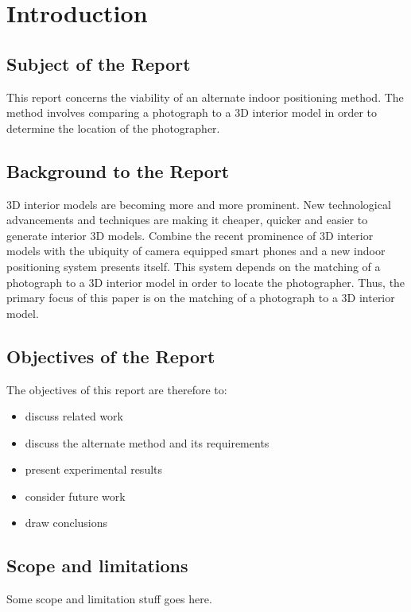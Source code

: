 \documentclass[11pt,a4paper]{report}
\begin{document}
\newpage
\tableofcontents

\newpage
\listoffigures

\setcounter{page}{0}

\newpage
\chapter{Introduction}
	\section{Subject of the Report}
		This report concerns the viability of an alternate indoor positioning method. The method involves comparing a photograph to a 3D interior model in order to determine the location of the photographer.
	
	\section{Background to the Report}
		3D interior models are becoming more and more prominent. New technological advancements and techniques are making it cheaper, quicker and easier to generate interior 3D models. Combine the recent prominence of 3D interior models with the ubiquity of camera equipped smart phones and a new indoor positioning system presents itself. This system depends on the matching of a photograph to a 3D interior model in order to locate the photographer. Thus, the primary focus of this paper is on the matching of a photograph to a 3D interior model.
	
	\section{Objectives of the Report}
		The objectives of this report are therefore to:
		\begin{itemize}
			\item
				discuss related work
			\item
				discuss the alternate method and its requirements
			\item
				present experimental results
			\item
				 consider future work
			\item
				draw conclusions
		\end{itemize}
	
	\section{Scope and limitations}
		Some scope and limitation stuff goes here.
	
\end{document}
